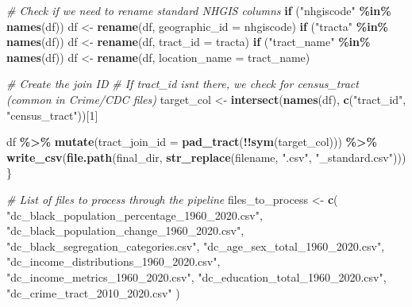 \documentclass[
]{article}
\newenvironment{Shaded}{\begin{snugshade}}{\end{snugshade}}
\newcommand{\AttributeTok}[1]{\textcolor[rgb]{0.13,0.29,0.53}{#1}}
\newcommand{\CommentTok}[1]{\textcolor[rgb]{0.56,0.35,0.01}{\textit{#1}}}
\newcommand{\ControlFlowTok}[1]{\textcolor[rgb]{0.13,0.29,0.53}{\textbf{#1}}}
\newcommand{\DecValTok}[1]{\textcolor[rgb]{0.00,0.00,0.81}{#1}}
\newcommand{\FunctionTok}[1]{\textcolor[rgb]{0.13,0.29,0.53}{\textbf{#1}}}
\newcommand{\NormalTok}[1]{#1}
\newcommand{\OtherTok}[1]{\textcolor[rgb]{0.56,0.35,0.01}{#1}}
\newcommand{\SpecialCharTok}[1]{\textcolor[rgb]{0.81,0.36,0.00}{\textbf{#1}}}
\newcommand{\StringTok}[1]{\textcolor[rgb]{0.31,0.60,0.02}{#1}}
\begin{document}
\begin{Shaded}
\begin{Highlighting}[]
  \CommentTok{\# Check if we need to rename standard NHGIS columns}
  \ControlFlowTok{if}\NormalTok{ (}\StringTok{"nhgiscode"} \SpecialCharTok{\%in\%} \FunctionTok{names}\NormalTok{(df)) df }\OtherTok{\textless{}{-}} \FunctionTok{rename}\NormalTok{(df, }\AttributeTok{geographic\_id =}\NormalTok{ nhgiscode)}
  \ControlFlowTok{if}\NormalTok{ (}\StringTok{"tracta"} \SpecialCharTok{\%in\%} \FunctionTok{names}\NormalTok{(df)) df }\OtherTok{\textless{}{-}} \FunctionTok{rename}\NormalTok{(df, }\AttributeTok{tract\_id =}\NormalTok{ tracta)}
  \ControlFlowTok{if}\NormalTok{ (}\StringTok{"tract\_name"} \SpecialCharTok{\%in\%} \FunctionTok{names}\NormalTok{(df)) df }\OtherTok{\textless{}{-}} \FunctionTok{rename}\NormalTok{(df, }\AttributeTok{location\_name =}\NormalTok{ tract\_name)}
  
  \CommentTok{\# Create the join ID}
  \CommentTok{\# If \textquotesingle{}tract\_id\textquotesingle{} isn\textquotesingle{}t there, we check for \textquotesingle{}census\_tract\textquotesingle{} (common in Crime/CDC files)}
\NormalTok{  target\_col }\OtherTok{\textless{}{-}} \FunctionTok{intersect}\NormalTok{(}\FunctionTok{names}\NormalTok{(df), }\FunctionTok{c}\NormalTok{(}\StringTok{"tract\_id"}\NormalTok{, }\StringTok{"census\_tract"}\NormalTok{))[}\DecValTok{1}\NormalTok{]}
  
\NormalTok{  df }\SpecialCharTok{\%\textgreater{}\%}
    \FunctionTok{mutate}\NormalTok{(}\AttributeTok{tract\_join\_id =} \FunctionTok{pad\_tract}\NormalTok{(}\SpecialCharTok{!!}\FunctionTok{sym}\NormalTok{(target\_col))) }\SpecialCharTok{\%\textgreater{}\%}
    \FunctionTok{write\_csv}\NormalTok{(}\FunctionTok{file.path}\NormalTok{(final\_dir, }\FunctionTok{str\_replace}\NormalTok{(filename, }\StringTok{".csv"}\NormalTok{, }\StringTok{"\_standard.csv"}\NormalTok{)))}
\NormalTok{\}}

\CommentTok{\# List of files to process through the pipeline}
\NormalTok{files\_to\_process }\OtherTok{\textless{}{-}} \FunctionTok{c}\NormalTok{(}
  \StringTok{"dc\_black\_population\_percentage\_1960\_2020.csv"}\NormalTok{,}
  \StringTok{"dc\_black\_population\_change\_1960\_2020.csv"}\NormalTok{,}
  \StringTok{"dc\_black\_segregation\_categories.csv"}\NormalTok{,}
  \StringTok{"dc\_age\_sex\_total\_1960\_2020.csv"}\NormalTok{,}
  \StringTok{"dc\_income\_distributions\_1960\_2020.csv"}\NormalTok{,}
  \StringTok{"dc\_income\_metrics\_1960\_2020.csv"}\NormalTok{,}
  \StringTok{"dc\_education\_total\_1960\_2020.csv"}\NormalTok{,}
  \StringTok{"dc\_crime\_tract\_2010\_2020.csv"}
\NormalTok{)}


\end{Highlighting}
\end{Shaded}
\end{document}
